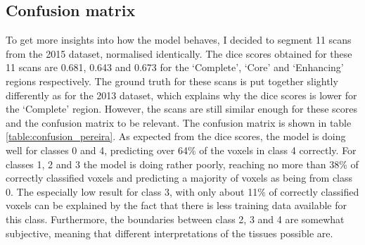 \documentclass[12pt,a4paper,twoside,openright]{report}
\newlength\figureheight
\newlength\figurewidth
\begin{document}
%
%	


\subsection{Confusion matrix}
To get more insights into how the model behaves, I decided to segment 11 scans from the 2015 dataset, normalised identically. The dice scores obtained for these 11 scans are 0.681, 0.643 and 0.673 for the `Complete', `Core' and `Enhancing' regions respectively. The ground truth for these scans is put together slightly differently as for the 2013 dataset, which explains why the dice scores is lower for the `Complete' region. However, the scans are still similar enough for these scores and the confusion matrix to be relevant. The confusion matrix is shown in table \ref{table:confusion_pereira}. As expected from the dice scores, the model is doing well for classes 0 and 4, predicting over 64\% of the voxels in class 4 correctly. For classes 1, 2 and 3 the model is doing rather poorly, reaching no more than 38\% of correctly classified voxels and predicting a majority of voxels as being from class 0. The especially low result for class 3, with only about 11\% of correctly classified voxels can be explained by the fact that there is less training data available for this class. Furthermore, the boundaries between class 2, 3 and 4 are somewhat subjective, meaning that different interpretations of the tissues possible are.
\end{document}
